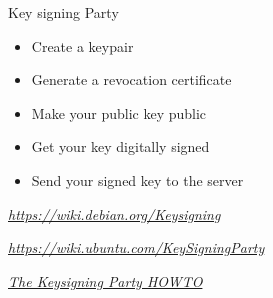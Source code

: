 \documentclass[UTF8]{ctexbeamer}
\begin{document}
\begin{frame}{Key signing Party}
    \begin{itemize}
        \item Create a keypair
        \item Generate a revocation certificate
        \item Make your public key public
        \item Get your key digitally signed
        \item Send your signed key to the server
    \end{itemize}
    
    \vspace{1em}
    
    \textit{\url{https://wiki.debian.org/Keysigning}}
    
    \textit{\url{https://wiki.ubuntu.com/KeySigningParty}}
    
    \textit{\href{https://cryptnet.net/fdp/crypto/keysigning_party/en/keysigning_party.html}{The Keysigning Party HOWTO}}
\end{frame}
\end{document}
